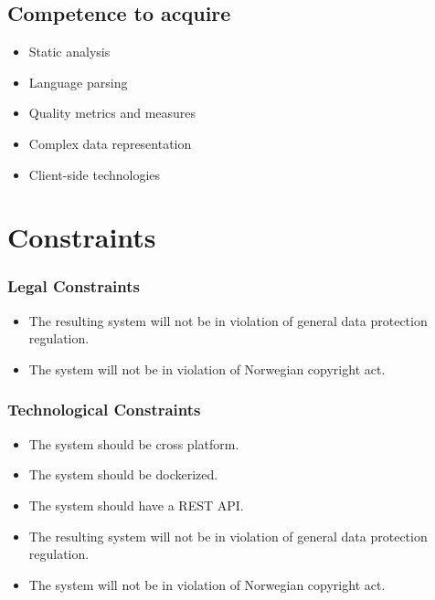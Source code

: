 \subsection{Competence to acquire}
\begin{itemize}
    \item Static analysis
    \item Language parsing
    \item Quality metrics and measures
    \item Complex data representation
    \item Client-side technologies  
\end{itemize}

\section{Constraints}

\subsubsection{Legal Constraints}
\begin{itemize}
    \item The resulting system will not be in violation of general data protection regulation. \cite{lovdata:gdpr}
    \item The system will not be in violation of Norwegian copyright act.
\end{itemize}

\subsubsection{Technological Constraints}

\begin{itemize}
    \item The system should be cross platform.
    \item The system should be dockerized.
    \item The system should have a REST API.
    \item The resulting system will not be in violation of general data protection regulation. \cite{lovdata:gdpr}
    \item The system will not be in violation of Norwegian copyright act.
\end{itemize}

